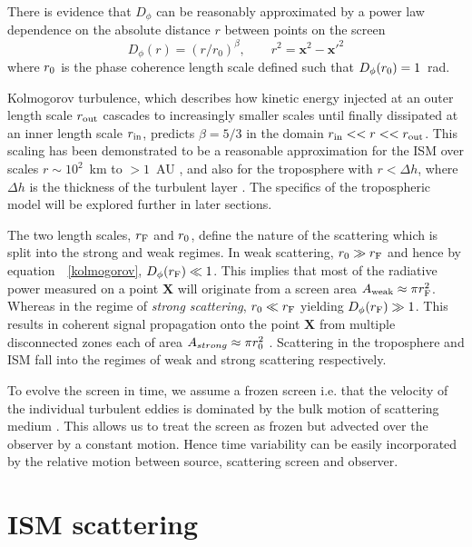 There is evidence that $D_\phi$ can be reasonably approximated by a power law dependence on the absolute distance $r$ between points on the screen  \citep{Armstrong_1995,carilli_1997}
\begin{equation}
D_\phi (r) =  (r/r_0)^\beta,\qquad r^2 = \mathbf{x}^2 - \mathbf{x'}^2
\label{kolmogorov}
\end{equation}
where $r_{\rm 0}$ is the phase coherence length scale defined such that $D_\phi(r_{\rm 0}) = 1$~rad. 

Kolmogorov turbulence, which describes how kinetic energy injected at an outer length scale $r_{\rm out}$ cascades to increasingly smaller scales until finally dissipated at an inner length scale $r_{\rm in}$, predicts $\beta = 5/3$ in the domain ${r_{\rm in}<<r<<r_{\rm out}}$. This scaling has been demonstrated to be a reasonable approximation for the ISM over scales $r \sim 10^2$~km to $>1$~AU \citep*{Johnson_2015a}, and also for the troposphere with $r< \Delta h$, where $\Delta h$ is the thickness of the turbulent layer \cite{Coulman_1985}. The specifics of the tropospheric model will be explored further in later sections.


The two length scales, $r_{\rm F}$ and $r_{\rm 0}$, define the nature of the scattering which is split into the strong and weak regimes. In weak scattering, $ r_{\rm 0} \gg r_{\rm F}$ and hence by equation\ ~\ref{kolmogorov}, $D_{\phi}(r_{\rm F}) \ll 1$. This implies that most of the radiative power measured on a point $\mathbf{X}$ will originate from a screen area $A_{\rm weak} \approx \pi r_{\rm F}^2$. Whereas in the regime of \emph{strong scattering}, $ r_{\rm 0} \ll r_{\rm F}$ yielding  $D_{\phi}(r_{\rm F}) \gg 1$. This  results in coherent signal propagation onto the point $\mathbf{X}$ from multiple disconnected zones each of area $A_{strong} \approx \pi r_{\rm 0}^2$ \citep{Narayan_1992}. Scattering in the troposphere and ISM fall into the regimes of weak and strong scattering respectively.


To evolve the screen in time, we assume a frozen screen i.e. that the velocity of the individual turbulent eddies is dominated by the bulk motion of scattering medium \citep[e.g.][]{Lay_1997}. This allows us to treat the screen as frozen but advected over the observer by a constant motion. Hence time variability can be easily incorporated by the relative motion between source, scattering screen and observer.


\section{ISM scattering}

